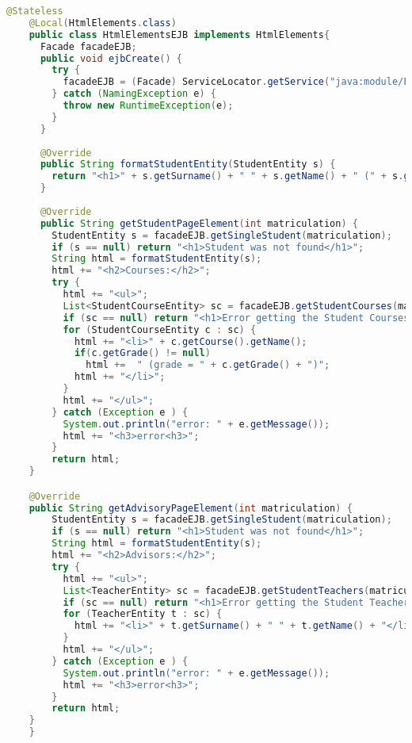 \begin{lstlisting}[language=java, caption={HtmlElementsEJB}]
    @Stateless
    @Local(HtmlElements.class)
    public class HtmlElementsEJB implements HtmlElements{
      Facade facadeEJB;
      public void ejbCreate() {
        try {
          facadeEJB = (Facade) ServiceLocator.getService("java:module/FacadeEJB!it.marrocco.h2ejbdemo.ejb.Facade");
        } catch (NamingException e) {
          throw new RuntimeException(e);
        }
      }
  
      @Override
      public String formatStudentEntity(StudentEntity s) {
        return "<h1>" + s.getSurname() + " " + s.getName() + " (" + s.getMatriculation() + ")</h1>";
      }
  
      @Override
      public String getStudentPageElement(int matriculation) {
        StudentEntity s = facadeEJB.getSingleStudent(matriculation);
        if (s == null) return "<h1>Student was not found</h1>";
        String html = formatStudentEntity(s);
        html += "<h2>Courses:</h2>";
        try {
          html += "<ul>";
          List<StudentCourseEntity> sc = facadeEJB.getStudentCourses(matriculation);
          if (sc == null) return "<h1>Error getting the Student Courses</h1>";
          for (StudentCourseEntity c : sc) {
            html += "<li>" + c.getCourse().getName();
            if(c.getGrade() != null)
              html +=  " (grade = " + c.getGrade() + ")";
            html += "</li>";
          }
          html += "</ul>";
        } catch (Exception e ) {
          System.out.println("error: " + e.getMessage());
          html += "<h3>error<h3>";
        }
        return html;
    }

    @Override
    public String getAdvisoryPageElement(int matriculation) {
        StudentEntity s = facadeEJB.getSingleStudent(matriculation);
        if (s == null) return "<h1>Student was not found</h1>";
        String html = formatStudentEntity(s);
        html += "<h2>Advisors:</h2>";
        try {
          html += "<ul>";
          List<TeacherEntity> sc = facadeEJB.getStudentTeachers(matriculation);
          if (sc == null) return "<h1>Error getting the Student Teachers</h1>";
          for (TeacherEntity t : sc) {
            html += "<li>" + t.getSurname() + " " + t.getName() + "</li>";
          }
          html += "</ul>";
        } catch (Exception e ) {
          System.out.println("error: " + e.getMessage());
          html += "<h3>error<h3>";
        }
        return html;
    }
    }
  \end{lstlisting}

